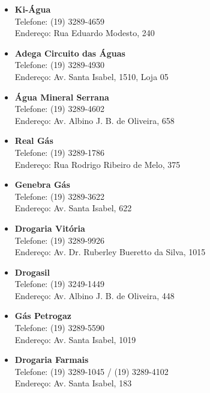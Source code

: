 \begin{itemize}
    \item  \textbf{Ki-Água}
        \\Telefone: (19) 3289-4659
        \\Endereço: Rua Eduardo Modesto, 240

    \item  \textbf{Adega Circuito das Águas}
        \\Telefone: (19) 3289-4930
        \\Endereço: Av. Santa Isabel, 1510, Loja 05

    \item  \textbf{Água Mineral Serrana}
        \\Telefone: (19) 3289-4602
        \\Endereço: Av. Albino J. B. de Oliveira, 658

    \item  \textbf{Real Gás}
        \\Telefone: (19) 3289-1786
        \\Endereço: Rua Rodrigo Ribeiro de Melo, 375

    \item  \textbf{Genebra Gás}
        \\Telefone: (19) 3289-3622
        \\Endereço: Av. Santa Isabel, 622

    \item  \textbf{Drogaria Vitória}
        \\Telefone: (19) 3289-9926
        \\Endereço: Av. Dr. Ruberley Bueretto da Silva, 1015
    
    \item  \textbf{Drogasil}
        \\Telefone: (19) 3249-1449
        \\Endereço: Av. Albino J. B. de Oliveira, 448
        
    \item  \textbf{Gás Petrogaz}
         \\Telefone: (19) 3289-5590
         \\Endereço: Av. Santa Isabel, 1019

    \item  \textbf{Drogaria Farmais}
         \\Telefone: (19) 3289-1045 / (19) 3289-4102
         \\Endereço: Av. Santa Isabel, 183


\end{itemize}

